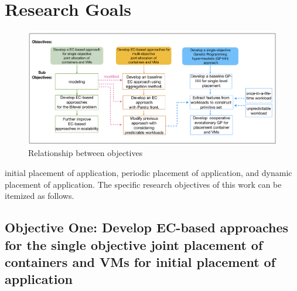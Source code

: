 \section{Research Goals}

\begin{figure}
	\centering
	\includegraphics[width=\textwidth]{pics/thesisPlan.png}
	\caption{Relationship between objectives}
	\label{fig:objectives}
\end{figure}
 initial placement of application, periodic placement of application, and dynamic placement of application. The specific research objectives of this work can be itemized as follows.

\subsection{Objective One: Develop EC-based approaches for the single objective joint placement of containers and VMs for initial placement of application}
\label{sec:obj1}

